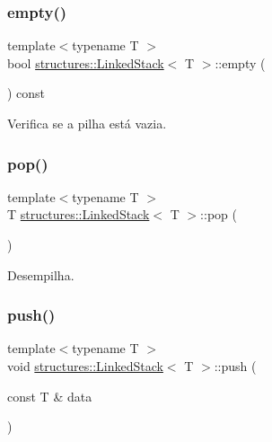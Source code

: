 \subsubsection{\texorpdfstring{empty()}{empty()}}
{\footnotesize\ttfamily template$<$typename T $>$ \\
bool \hyperlink{classstructures_1_1LinkedStack}{structures\+::\+Linked\+Stack}$<$ T $>$\+::empty (\begin{DoxyParamCaption}{ }\end{DoxyParamCaption}) const}



Verifica se a pilha está vazia. 

\mbox{\label{classstructures_1_1LinkedStack_a8ff0ba0de594ec26971bb259e1d28c3c}} 
\subsubsection{\texorpdfstring{pop()}{pop()}}
{\footnotesize\ttfamily template$<$typename T $>$ \\
T \hyperlink{classstructures_1_1LinkedStack}{structures\+::\+Linked\+Stack}$<$ T $>$\+::pop (\begin{DoxyParamCaption}{ }\end{DoxyParamCaption})}



Desempilha. 

\mbox{\label{classstructures_1_1LinkedStack_adb8c6b231298ac25b17ba692d510a3fc}} 
\subsubsection{\texorpdfstring{push()}{push()}}
{\footnotesize\ttfamily template$<$typename T $>$ \\
void \hyperlink{classstructures_1_1LinkedStack}{structures\+::\+Linked\+Stack}$<$ T $>$\+::push (\begin{DoxyParamCaption}\item[{const T \&}]{data }\end{DoxyParamCaption})}



